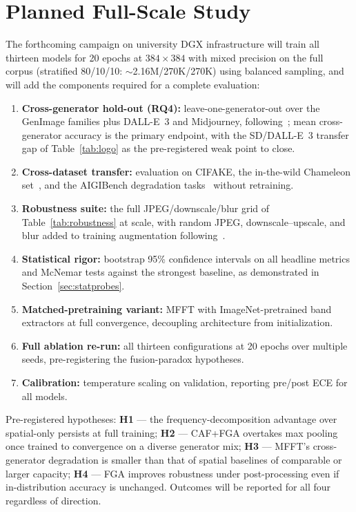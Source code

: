\documentclass[journal]{IEEEtran}
\begin{document}
\section{Planned Full-Scale Study}
\label{sec:fullscale}
The forthcoming campaign on university DGX infrastructure will train all thirteen models for 20 epochs at $384\times384$ with mixed precision on the full corpus (stratified 80/10/10: $\sim$2.16M/270K/270K) using balanced sampling, and will add the components required for a complete evaluation:
\begin{enumerate}
    \item \textbf{Cross-generator hold-out (RQ4):} leave-one-generator-out over the GenImage families plus DALL-E~3 and Midjourney, following~\cite{zhu2023genimage}; mean cross-generator accuracy is the primary endpoint, with the SD/DALL-E~3 transfer gap of Table~\ref{tab:logo} as the pre-registered weak point to close.
    \item \textbf{Cross-dataset transfer:} evaluation on CIFAKE, the in-the-wild Chameleon set~\cite{yan2025sanity}, and the AIGIBench degradation tasks~\cite{li2025aigibench} without retraining.
    \item \textbf{Robustness suite:} the full JPEG/downscale/blur grid of Table~\ref{tab:robustness} at scale, with random JPEG, downscale--upscale, and blur added to training augmentation following~\cite{wang2020}.
    \item \textbf{Statistical rigor:} bootstrap 95\% confidence intervals on all headline metrics and McNemar tests against the strongest baseline, as demonstrated in Section~\ref{sec:statprobes}.
    \item \textbf{Matched-pretraining variant:} MFFT with ImageNet-pretrained band extractors at full convergence, decoupling architecture from initialization.
    \item \textbf{Full ablation re-run:} all thirteen configurations at 20 epochs over multiple seeds, pre-registering the fusion-paradox hypotheses.
    \item \textbf{Calibration:} temperature scaling on validation, reporting pre/post ECE for all models.
\end{enumerate}
Pre-registered hypotheses: \textbf{H1} --- the frequency-decomposition advantage over spatial-only persists at full training; \textbf{H2} --- CAF+FGA overtakes max pooling once trained to convergence on a diverse generator mix; \textbf{H3} --- MFFT's cross-generator degradation is smaller than that of spatial baselines of comparable or larger capacity; \textbf{H4} --- FGA improves robustness under post-processing even if in-distribution accuracy is unchanged. Outcomes will be reported for all four regardless of direction.
\end{document}
